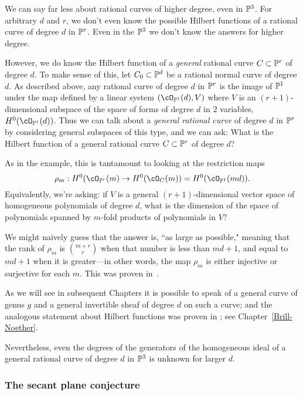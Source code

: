 We can say far less about rational curves of higher degree, even in $\PP^3$.  For arbitrary $d$ and $r$, we don't even know the possible Hilbert functions of a rational curve of degree $d$ in $\PP^r$. Even in the $\PP^3$ we don't know the answers for higher degree.

However, we do know the Hilbert function of a \emph{general} rational curve $C \subset \PP^r$ of degree $d$. To make sense of this, let $C_0 \subset \PP^d$ be a rational normal curve of degree $d$. 
As described above, any rational curve of degree $d$ in $\PP^r$ is the image of $\PP^1$ under the map defined by
a linear system $(\op1d, V)$ where $V$ is an $(r+1)$-dimensional subspace of the space of
forms of degree $d$ in 2 variables, $H^0(\op1d)$. Thus we can talk about a \emph{general rational curve} of degree $d$ in $\PP^r$ by considering general subspaces of this type, and we can ask:
What is the Hilbert function of a general rational curve $C \subset \PP^r$ of degree $d$? 

As in the example, this is tantamount to looking at the restriction maps
$$
\rho_m : H^0(\cO_{\PP^r}(m) \to H^0(\cO_C(m)) = H^0(\cO_{\PP^1}(md)).
$$
Equivalently, we're asking: if $V$ is a general  $(r+1)$-dimensional vector space of homogeneous polynomials of degree $d$, what is the dimension of the space of polynomials spanned by $m$-fold products of polynomials in $V$? 

We might naively guess that the answer is, ``as large as possible," meaning that the rank of $\rho_m$ is $\binom{m+r}{r}$ when that number is less than $md+1$, and equal to $md+1$ when it is greater---in other words, the map $\rho_m$ is either injective or surjective for each $m$. This was proven in~\cite{Ballico-Ellia83}. 

As we will see in subsequent Chapters it is possible to speak of a general curve of genus $g$
and a general invertible sheaf of degree $d$ on such a curve; and the analogous statement 
about Hilbert functions  was proven in \cite{ELarson2018}; see Chapter~\ref{Brill-Noether}.

Nevertheless, even the degrees of the generators of the homogeneous ideal of a general
rational curve of degree $d$ in $\PP^3$ is unknown for larger $d$. 

\subsubsection{The secant plane conjecture}


